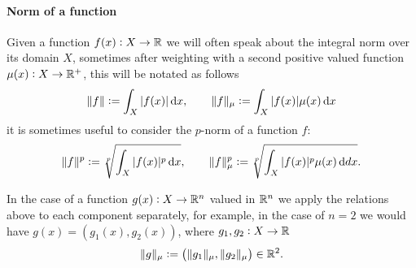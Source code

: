 \paragraph{Norm of a function}
Given a function $f(x): X\to\mathbb{R}$ we will often speak about the integral norm over its
domain $X$, sometimes after weighting with a second positive valued function
$\mu(x): X\to\mathbb{R}^+$, this will be notated as follows
\begin{displaymath}
\|f\| := \int_X |f(x)| \mathop{}\!\mathrm{d} x, \qquad \|f\|_\mu := \int_X |f(x)| \mu(x) \mathop{}\!\mathrm{d} x
\end{displaymath}
it is sometimes useful to consider the $p$-norm of a function $f$:
\begin{displaymath}
\|f\|^p := \sqrt[p]{\int_X |f(x)|^p \mathop{}\!\mathrm{d} x}, \qquad \|f\|_\mu^p := \sqrt[p]{\int_X |f(x)|^p \mu(x)\mathop{}\!\mathrm{d} dx}.
\end{displaymath}

In the case of a function $g(x): X\to\mathbb{R}^n$ valued in $\mathbb{R}^n$ we apply the
relations above to
each component separately, for example, in the case of $n = 2$ we would have
$g(x) = (g_1(x), g_2(x))$, where $g_1,g_2:X\to\mathbb{R}$
\begin{displaymath}
\|g\|_\mu := \left(\|g_1\|_\mu, \|g_2\|_\mu\right) \in \mathbb{R}^2.
\end{displaymath}
